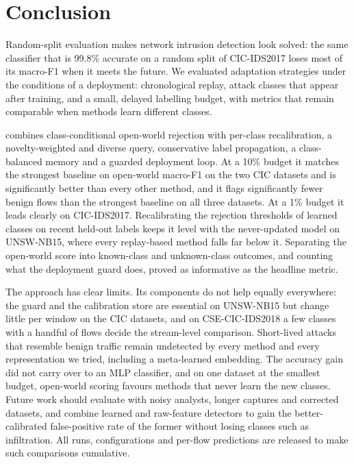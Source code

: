\section{Conclusion}
\label{sec:conclusion}

Random-split evaluation makes network intrusion detection look solved: the same classifier that is 99.8\% accurate
on a random split of CIC-IDS2017 loses most of its macro-F1 when it meets the future. We evaluated adaptation
strategies under the conditions of a deployment: chronological replay, attack classes that appear after training,
and a small, delayed labelling budget, with metrics that remain comparable when methods learn different classes.

\nova{} combines class-conditional open-world rejection with per-class recalibration, a novelty-weighted and
diverse query, conservative label propagation, a class-balanced memory and a guarded deployment loop. At a 10\%
budget it matches the strongest baseline on open-world macro-F1 on the two CIC datasets and is significantly
better than every other method, and it flags significantly fewer benign flows than the strongest baseline on all
three datasets. At a 1\% budget it leads clearly on CIC-IDS2017. Recalibrating the rejection thresholds of learned
classes on recent held-out labels keeps it level with the never-updated model on UNSW-NB15, where every
replay-based method falls far below it. Separating the open-world score into known-class and unknown-class outcomes,
and counting what the deployment guard does, proved as informative as the headline metric.

The approach has clear limits. Its components do not help equally everywhere: the guard and the calibration store
are essential on UNSW-NB15 but change little per window on the CIC datasets, and on CSE-CIC-IDS2018 a few classes
with a handful of flows decide the stream-level comparison. Short-lived attacks that resemble benign traffic remain undetected by every method
and every representation we tried, including a meta-learned embedding. The accuracy gain did not carry over to an
MLP classifier, and on one dataset at the smallest budget, open-world scoring favours methods that never learn the
new classes. Future work should evaluate with noisy analysts, longer captures and corrected datasets, and combine
learned and raw-feature detectors to gain the better-calibrated false-positive rate of the former without losing
classes such as infiltration. All runs, configurations and per-flow predictions are released to make such
comparisons cumulative.
